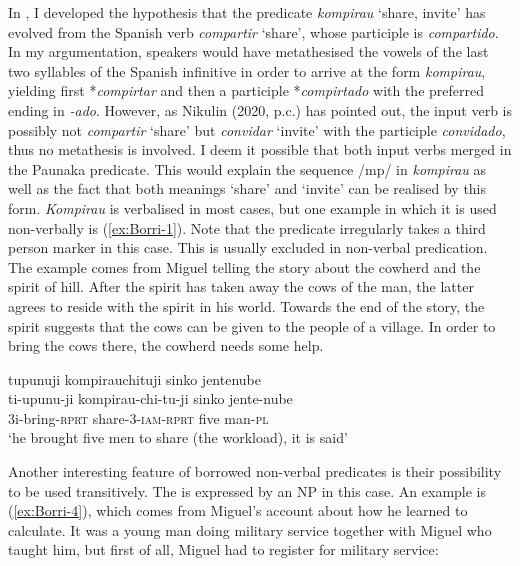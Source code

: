 In \citet[8]{Terhart_subm}, I developed the hypothesis that the predicate \textit{kompirau} ‘share, invite’ has evolved from the Spanish verb \textit{compartir} ‘share’, whose participle is \textit{compartido}. In my argumentation, speakers would have metathesised the vowels of the last two syllables of the Spanish infinitive in order to arrive at the form \textit{kompirau}, yielding first *\textit{compirtar} and then a participle *\textit{compirtado} with the preferred ending in \textit{-ado}. However, as Nikulin (2020, p.c.) has pointed out, the input verb is possibly not \textit{compartir} ‘share’ but \textit{convidar} ‘invite’ with the participle \textit{convidado}, thus no metathesis is involved. I deem it possible that both input verbs merged in the Paunaka predicate. This would explain the sequence /mp/ in \textit{kompirau} as well as the fact that both meanings ‘share’ and ‘invite’ can be realised by this form. \textit{Kompirau} is verbalised in most cases, but one example in which it is used non-verbally is (\ref{ex:Borri-1}). Note that the predicate irregularly takes a third person marker in this case. This is usually excluded in non-verbal predication. The example comes from Miguel telling the story about the cowherd and the spirit of hill. After the spirit has taken away the cows of the man, the latter agrees to reside with the spirit in his world. Towards the end of the story, the spirit suggests that the cows can be given to the people of a village. In order to bring the cows there, the cowherd needs some help.

\ea\label{ex:Borri-1}
\begingl 
\glpreamble tupunuji kompirauchituji sinko jentenube\\
\gla ti-upunu-ji kompirau-chi-tu-ji sinko jente-nube\\ 
\glb 3i-bring-\textsc{rprt} share-3-\textsc{iam}-\textsc{rprt} five man-\textsc{pl}\\ 
\glft ‘he brought five men to share (the workload), it is said’\\ 
\endgl
\trailingcitation{[mxx-n151017l-1.81]}
\xe

Another interesting feature of borrowed non-verbal predicates is their possibility to be used transitively. The  is expressed by an NP in this case. An example is (\ref{ex:Borri-4}), which comes from Miguel’s account about how he learned to calculate. It was a young man doing military service together with Miguel who taught him, but first of all, Miguel had to register for military service:

